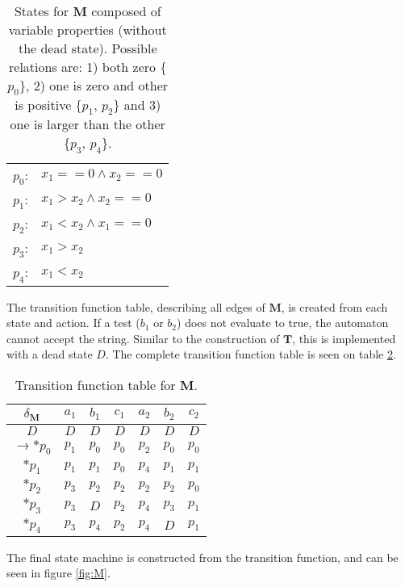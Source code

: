 \begin{table}[H]
    \centering
    \begin{tabular}{cl}
    $p_0$:   &   $x_1 == 0 \land x_2 == 0$   \vspace{2 mm}\\
    $p_1$:   &   $x_1 > x_2 \land x_2 == 0$ \vspace{2 mm}\\
    $p_2$:   &   $x_1 < x_2 \land x_1 == 0 $ \vspace{2 mm}\\
    $p_3$:   &   $x_1 > x_2$ \vspace{2 mm}\\
    $p_4$:   &   $x_1 < x_2$ \\
    \end{tabular}
    \caption{States for $\mathbf{M}$ composed of variable properties (without the dead state). Possible relations are: 1) both zero \{$p_0$\}, 2) one is zero and other is positive \{$p_1$,  $p_2$\} and 3) one is larger than the other \{$p_3$, $p_4$\}.  }
    \label{tab:Mstates}
\end{table}

The transition function table, describing all edges of $\mathbf{M}$, is created from each state and action. If a test ($b_1$ or $b_2$) does not evaluate to true, the automaton cannot accept the string. Similar to the construction of $\mathbf{T}$, this is implemented with a dead state $D$. The complete transition function table is seen on table \ref{tab:Mt}.

\begin{table}[H]
    \centering
    \begin{tabular}{|c||c|c|c|c|c|c|}
    \hline
    $\delta_{\mathbf{M}}$   &   $a_1$   &   $b_1$   &   $c_1$   &   $a_2$   &   $b_2$   &   $c_2$   \\  \hline \hline
    $D$ &   $D$ &   $D$ &   $D$ &   $D$ &   $D$ &   $D$ \\ \hline
    $\rightarrow *p_0$   &   $p_1$   &   $p_0$   &   $p_0$   &   $p_2$   &   $p_0$   &   $p_0$   \\  \hline
    $*p_1$   &   $p_1$   &   $p_1$   &   $p_0$   &   $p_4$   &   $p_1$   &   $p_1$   \\  \hline   
    $*p_2$   &   $p_3$   &   $p_2$   &   $p_2$   &   $p_2$   &   $p_2$   &   $p_0$   \\  \hline
    $*p_3$   &   $p_3$   &   $D$   &   $p_2$   &   $p_4$   &   $p_3$   &   $p_1$   \\  \hline
    $*p_4$   &   $p_3$   &   $p_4$   &   $p_2$   &   $p_4$   &   $D$   &   $p_1$   \\  \hline
    \end{tabular}
    \caption{Transition function table for $\mathbf{M}$.}
    \label{tab:Mt}
\end{table}
 The final state machine is constructed from the transition function, and can be seen in figure \ref{fig:M}.

